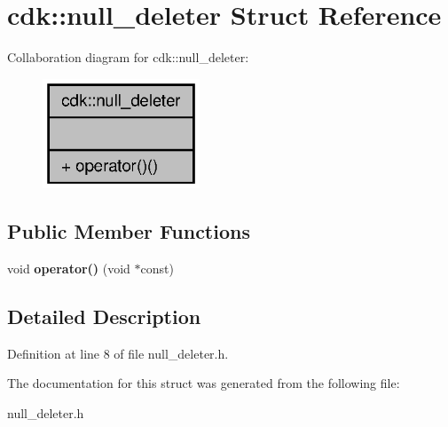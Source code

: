 \section{cdk\+:\+:null\+\_\+deleter Struct Reference}
\label{structcdk_1_1null__deleter}


Collaboration diagram for cdk\+:\+:null\+\_\+deleter\+:
\nopagebreak
\begin{figure}[H]
\begin{center}
\leavevmode
\includegraphics[width=133pt]{structcdk_1_1null__deleter__coll__graph}
\end{center}
\end{figure}
\subsection*{Public Member Functions}
\begin{DoxyCompactItemize}
\item 
\mbox{\label{structcdk_1_1null__deleter_ac230eb90b96a0413d7ca6c99b86c5fa2}} 
void {\bfseries operator()} (void $\ast$const)
\end{DoxyCompactItemize}


\subsection{Detailed Description}


Definition at line 8 of file null\+\_\+deleter.\+h.



The documentation for this struct was generated from the following file\+:\begin{DoxyCompactItemize}
\item 
null\+\_\+deleter.\+h\end{DoxyCompactItemize}
